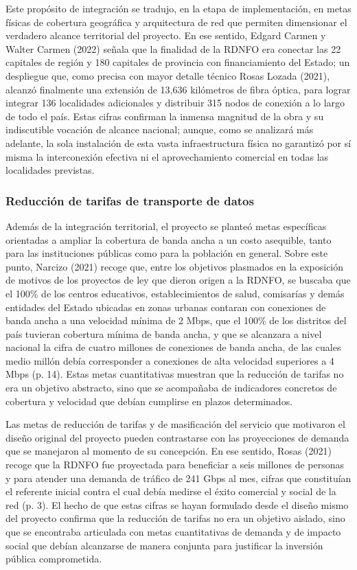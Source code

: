 Este propósito de integración se tradujo, en la etapa de implementación, en metas físicas de cobertura geográfica y arquitectura de red que permiten dimensionar el verdadero alcance territorial del proyecto. En ese sentido, Edgard Carmen y Walter Carmen (2022) señala que la finalidad de la RDNFO era conectar las 22 capitales de región y 180 capitales de provincia con financiamiento del Estado; un despliegue que, como precisa con mayor detalle técnico Rosas Lozada (2021), alcanzó finalmente una extensión de 13,636 kilómetros de fibra óptica, para lograr integrar 136 localidades adicionales y distribuir 315 nodos de conexión a lo largo de todo el país. Estas cifras confirman la inmensa magnitud de la obra y su indiscutible vocación de alcance nacional; aunque, como se analizará más adelante, la sola instalación de esta vasta infraestructura física no garantizó por sí misma la interconexión efectiva ni el aprovechamiento comercial en todas las localidades previstas.

\subsubsection{Reducción de tarifas de transporte de datos}
Además de la integración territorial, el proyecto se planteó metas específicas orientadas a ampliar la cobertura de banda ancha a un costo asequible, tanto para las instituciones públicas como para la población en general. Sobre este punto, Narcizo (2021) recoge que, entre los objetivos plasmados en la exposición de motivos de los proyectos de ley que dieron origen a la RDNFO, se buscaba que el 100\% de los centros educativos, establecimientos de salud, comisarías y demás entidades del Estado ubicadas en zonas urbanas contaran con conexiones de banda ancha a una velocidad mínima de 2 Mbps, que el 100\% de los distritos del país tuvieran cobertura mínima de banda ancha, y que se alcanzara a nivel nacional la cifra de cuatro millones de conexiones de banda ancha, de las cuales medio millón debía corresponder a conexiones de alta velocidad superiores a 4 Mbps (p. 14). Estas metas cuantitativas muestran que la reducción de tarifas no era un objetivo abstracto, sino que se acompañaba de indicadores concretos de cobertura y velocidad que debían cumplirse en plazos determinados.

Las metas de reducción de tarifas y de masificación del servicio que motivaron el diseño original del proyecto pueden contrastarse con las proyecciones de demanda que se manejaron al momento de su concepción. En ese sentido, Rosas (2021) recoge que la RDNFO fue proyectada para beneficiar a seis millones de personas y para atender una demanda de tráfico de 241 Gbps al mes, cifras que constituían el referente inicial contra el cual debía medirse el éxito comercial y social de la red (p. 3). El hecho de que estas cifras se hayan formulado desde el diseño mismo del proyecto confirma que la reducción de tarifas no era un objetivo aislado, sino que se encontraba articulada con metas cuantitativas de demanda y de impacto social que debían alcanzarse de manera conjunta para justificar la inversión pública comprometida.

